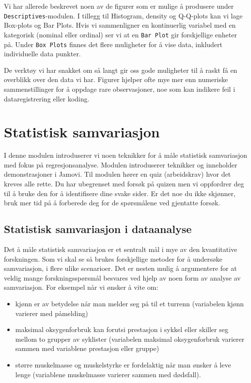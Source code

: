 \documentclass[
  letterpaper,
  DIV=11,
  numbers=noendperiod,
  oneside]{scrreprt}
\providecommand{\tightlist}{%
  \setlength{\itemsep}{0pt}\setlength{\parskip}{0pt}}\usepackage{longtable,booktabs,array}
\begin{document}
Vi har allerede beskrevet noen av de figurer som er mulige å produsere
under \texttt{Descriptives}-modulen. I tillegg til Histogram, density og
Q-Q-plots kan vi lage Box-plots og Bar Plots. Hvis vi sammenligner en
kontinuerlig variabel med en kategorisk (nominal eller ordinal) ser vi
at en \texttt{Bar\ Plot} gir forskjellige enheter på. Under
\texttt{Box\ Plots} finnes det flere muligheter for å vise data,
inkludert individuelle data punkter.

De verktøy vi har snakket om så langt gir oss gode muligheter til å
raskt få en overblikk over den data vi har. Figurer hjelper ofte mye mer
enn numeriske sammenstillinger for å oppdage rare observasjoner, noe som
kan indikere feil i dataregistrering eller koding.

\part{Statistisk samvariasjon}

I denne modulen introduserer vi noen teknikker for å måle statistisk
samvariasjon med fokus på regresjonsanalyse. Modulen introduserer
teknikker og inneholder demonstrasjoner i Jamovi. Til modulen hører en
quiz (arbeidskrav) hvor det kreves alle rette. Du har ubegrenset med
forsøk på quizen men vi oppfordrer deg til å bruke den for å
identifisere dine svake sider. Er det noe du ikke skjønner, bruk mer tid
på å forberede deg for de spørsmålene ved gjentatte forsøk.

\hypertarget{statistisk-samvariasjon-i-dataanalyse}{%
\chapter{Statistisk samvariasjon i
dataanalyse}\label{statistisk-samvariasjon-i-dataanalyse}}

Det å måle statistisk samvariasjon er et sentralt mål i mye av den
kvantitative forskningen. Som vi skal se så brukes forskjellige metoder
for å undersøke samvariasjon, i flere ulike scenarioer. Det er nesten
mulig å argumentere for at veldig mange forskningsspørsmål besvares ved
hjelp av noen form av analyse av samvariasjon. For eksempel når vi
ønsker å vite om:

\begin{itemize}
\tightlist
\item
  kjønn er av betydelse når man melder seg på til et turrenn (variabelen
  kjønn varierer med påmelding)
\item
  maksimal oksygenforbruk kan forutsi prestasjon i sykkel eller skiller
  seg mellom to grupper av syklister (variabelen maksimal oksygenforbruk
  varierer sammen med variablene prestasjon eller gruppe)
\item
  større muskelmasse og muskelstyrke er fordelaktig når man ønsker å
  leve lenge (variablene muskelmasse varierer sammen med dødsfall).
\end{itemize}
\end{document}

